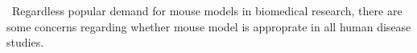 \ Regardless popular demand for mouse models in biomedical research, there are some concerns regarding whether mouse model is approprate in all human disease studies. 